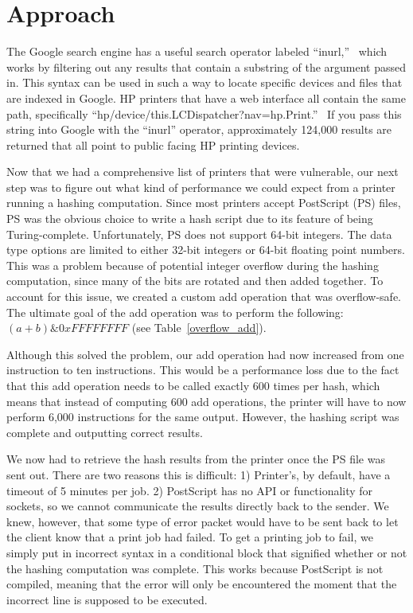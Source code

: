 \section{Approach}

The Google search engine has a useful search operator labeled “inurl,”  which works by filtering out any results that contain a substring of the argument passed in.
This syntax can be used in such a way to locate specific devices and files that are indexed in Google.
HP printers that have a web interface all contain the same path, specifically “hp/device/this.LCDispatcher?nav=hp.Print.”  If you pass this string into Google with the “inurl” operator, approximately 124,000 results are returned that all point to public facing HP printing devices.

Now that we had a comprehensive list of printers that were vulnerable, our next step was to figure out what kind of performance we could expect from a printer running a hashing computation.
Since most printers accept PostScript (PS) files, PS was the obvious choice to write a hash script due to its feature of being Turing-complete.
Unfortunately, PS does not support 64-bit integers.
The data type options are limited to either 32-bit integers or 64-bit floating point numbers.
This was a problem because of potential integer overflow during the hashing computation, since many of the bits are rotated and then added together.
To account for this issue, we created a custom add operation that was overflow-safe.
The ultimate goal of the add operation was to perform the following: $(a + b) \& 0xFFFFFFFF$ (see Table~\ref{overflow_add}).

\begin{table}
\label{overflow_add}
\end{table}

Although this solved the problem, our add operation had now increased from one instruction to ten instructions.
This would be a performance loss due to the fact that this add operation needs to be called exactly 600 times per hash, which means that instead of computing 600 add operations, the printer will have to now perform 6,000 instructions for the same output.
However, the hashing script was complete and outputting correct results.

We now had to retrieve the hash results from the printer once the PS file was sent out.
There are two reasons this is difficult: 1) Printer’s, by default, have a timeout of 5 minutes per job.
2) PostScript has no API or functionality for sockets, so we cannot communicate the results directly back to the sender.
We knew, however, that some type of error packet would have to be sent back to let the client know that a print job had failed.
To get a printing job to fail, we simply put in incorrect syntax in a conditional block that signified whether or not the hashing computation was complete.
This works because PostScript is not compiled, meaning that the error will only be encountered the moment that the incorrect line is supposed to be executed.

